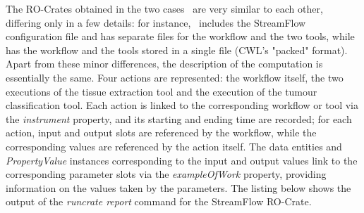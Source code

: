 \documentclass[10pt,letterpaper]{article}
\begin{document}
The RO-Crates obtained in the two cases~\cite{Colonnelli 2023, Leo 2023b}
are very similar to each other, differing only in a few details: for instance,~\cite{Colonnelli 2023} includes the StreamFlow configuration file and has separate files for the workflow and the two tools, while
\cite{Leo 2023b} has the workflow and the tools stored in a single file (CWL's "packed" format).
Apart from these minor differences, the description of the computation is essentially the same.
Four actions are represented: the workflow itself, the two executions of the tissue extraction tool and the execution of the tumour classification tool.
Each action is linked to the corresponding workflow or tool via the
\emph{instrument} property, and its starting and ending time are recorded; for each action, input and output slots are referenced by the workflow, while the corresponding values are referenced by the action itself.
The data entities and \emph{PropertyValue} instances corresponding to the input and output values link to the corresponding parameter slots via the \emph{exampleOfWork} property, providing information on the values taken by the parameters.
The listing below shows the output of the
\emph{runcrate report} command for the StreamFlow RO-Crate.
\end{document}
